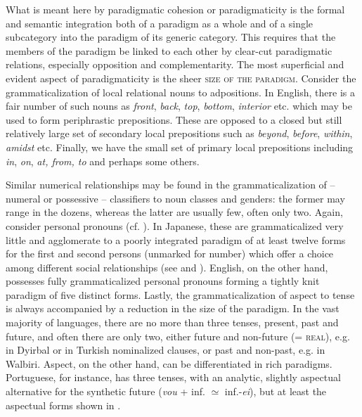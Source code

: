 What is meant here by paradigmatic cohesion or paradigmaticity is the formal and semantic integration both of a paradigm as a whole and of a single subcategory into the paradigm of its generic category. This requires that the members of the paradigm be linked to each other by clear-cut paradigmatic relations, especially opposition and complementarity. The most superficial and evident aspect of paradigmaticity is the sheer \textsc{size of the paradigm}. Consider the grammaticalization of local relational nouns to adpositions. In English, there is a fair number of such nouns as \textit{front}, \textit{back}, \textit{top}, \textit{bottom}, \textit{interior} etc. which may be used to form periphrastic prepositions. These are opposed to a closed but still relatively large set of secondary local prepositions such as \textit{beyond}, \textit{before}, \textit{within}, \textit{amidst} etc. Finally, we have the small set of primary local prepositions including \textit{in}, \textit{on}, \textit{at, from, to} and perhaps some others.

Similar numerical relationships may be found in the grammaticalization of -- numeral or possessive -- classifiers to noun classes and genders: the former may range in the dozens, whereas the latter are usually few, often only two. Again, consider personal pronouns (cf. ). In Japanese, these are grammaticalized very little and agglomerate to a poorly integrated paradigm of at least twelve forms for the first and second persons (unmarked for number) which offer a choice among different social relationships (see \citealt{Alpatov1980} and \citealt{Coulmas1980}). English, on the other hand, possesses fully grammaticalized personal pronouns forming a tightly knit paradigm of five distinct forms. Lastly, the grammaticalization of aspect to tense is always accompanied by a reduction in the size of the paradigm. In the vast majority of languages, there are no more than three tenses, present, past and future, and often there are only two, either future and non-future (= \textsc{real}), e.g. in Dyirbal or in Turkish nominalized clauses, or past and non-past, e.g. in Walbiri. Aspect, on the other hand, can be differentiated in rich paradigms. Portuguese, for instance, has three tenses, with an analytic, slightly aspectual alternative for the synthetic future (\textit{vou} + inf. ${\simeq}$ inf.-\textit{ei}), but at least the aspectual forms shown in .

